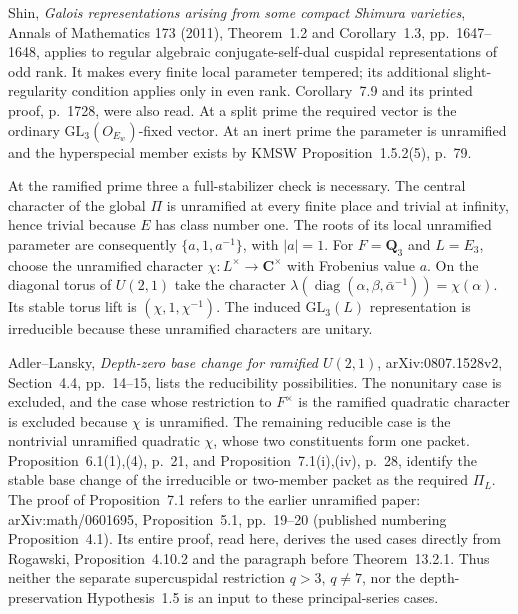 \documentclass[11pt,a4paper]{article}
\theoremstyle{definition}
\begin{document}
Shin, \emph{Galois representations arising from some compact Shimura
varieties}, Annals of Mathematics 173 (2011), Theorem~1.2 and
Corollary~1.3, pp.~1647--1648, applies to regular algebraic
conjugate-self-dual cuspidal representations of odd rank.
It makes every finite local parameter tempered; its additional
slight-regularity condition applies only in even rank.
Corollary~7.9 and its printed proof, p.~1728, were also read.
At a split prime the required vector is the ordinary
$\mathrm{GL}_3(O_{E_w})$-fixed vector.
At an inert prime the parameter is unramified and the hyperspecial
member exists by KMSW Proposition~1.5.2(5), p.~79.

At the ramified prime three a full-stabilizer check is necessary.
The central character of the global $\Pi$ is unramified at every
finite place and trivial at infinity, hence trivial because $E$
has class number one. The roots of its local unramified parameter
are consequently $\{a,1,a^{-1}\}$, with $|a|=1$.
For $F=\mathbf Q_3$ and $L=E_3$, choose the unramified character
$\chi:L^\times\to\mathbf C^\times$ with Frobenius value $a$.
On the diagonal torus of $U(2,1)$ take the character
$\lambda(\operatorname{diag}(\alpha,\beta,\bar\alpha^{-1}))
=\chi(\alpha)$.
Its stable torus lift is $(\chi,1,\chi^{-1})$.
The induced $\mathrm{GL}_3(L)$ representation is irreducible
because these unramified characters are unitary.

Adler--Lansky, \emph{Depth-zero base change for ramified $U(2,1)$},
arXiv:0807.1528v2, Section~4.4, pp.~14--15, lists the reducibility
possibilities. The nonunitary case is excluded, and the case whose
restriction to $F^\times$ is the ramified quadratic character is
excluded because $\chi$ is unramified. The remaining reducible
case is the nontrivial unramified quadratic $\chi$, whose two
constituents form one packet.
Proposition~6.1(1),(4), p.~21, and Proposition~7.1(i),(iv), p.~28,
identify the stable base change of the irreducible or two-member
packet as the required $\Pi_L$.
The proof of Proposition~7.1 refers to the earlier unramified paper:
arXiv:math/0601695, Proposition~5.1, pp.~19--20 (published
numbering Proposition~4.1). Its entire proof, read here, derives
the used cases directly from Rogawski, Proposition~4.10.2 and
the paragraph before Theorem~13.2.1.
Thus neither the separate supercuspidal restriction
$q>3$, $q\ne7$, nor the depth-preservation Hypothesis~1.5 is an
input to these principal-series cases.
\end{document}
